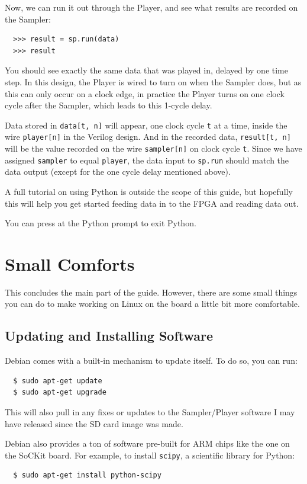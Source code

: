 \documentclass{sockitguide}
\begin{document}
Now, we can run it out through the Player, and see what results are
recorded on the Sampler:
\begin{verbatim}
  >>> result = sp.run(data)
  >>> result
\end{verbatim}

You should see exactly the same data that was played in, delayed by
one time step. In this design, the Player is wired to turn on when the
Sampler does, but as this can only occur on a clock edge, in practice
the Player turns on one clock cycle after the Sampler, which leads to
this 1-cycle delay.

Data stored in \texttt{data[t, n]} will appear, one clock cycle
\texttt{t} at a time, inside the wire \texttt{player[n]} in the
Verilog design. And in the recorded data, \texttt{result[t, n]} will
be the value recorded on the wire \texttt{sampler[n]} on clock cycle
\texttt{t}. Since we have assigned \texttt{sampler} to equal
\texttt{player}, the data input to \texttt{sp.run} should match the
data output (except for the one cycle delay mentioned above).

A full tutorial on using Python is outside the scope of this guide,
but hopefully this will help you get started feeding data in to the
FPGA and reading data out.

You can press  at the Python prompt to exit Python.

\section{Small Comforts}

This concludes the main part of the guide. However, there are some
small things you can do to make working on Linux on the board a little
bit more comfortable.

\subsection{Updating and Installing Software}

Debian comes with a built-in mechanism to update itself. To do so, you
can run:
\begin{verbatim}
  $ sudo apt-get update
  $ sudo apt-get upgrade
\end{verbatim}

This will also pull in any fixes or updates to the Sampler/Player
software I may have released since the SD card image was made.

Debian also provides a ton of software pre-built for ARM chips like
the one on the SoCKit board. For example, to install \texttt{scipy}, a
scientific library for Python:
\begin{verbatim}
  $ sudo apt-get install python-scipy
\end{verbatim}
\end{document}
